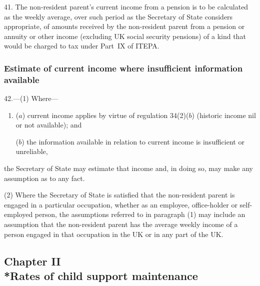 \documentclass[12pt,a4paper]{article}
\begin{document}
41.  The non-resident parent’s current income from a pension is to be calculated as the weekly average, over such period as the Secretary of State considers appropriate, of amounts received by the non-resident parent from a pension or annuity or other income (excluding UK social security pensions) of a kind that would be charged to tax under Part~IX of ITEPA.

\subsubsection[42. Estimate of current income where insufficient information available]{Estimate of current income where insufficient information available}

42.---(1)  Where—
\begin{enumerate}\item[]
($a$) current income applies by virtue of 
regulation 34(2)($b$)  
(historic income 
nil or  %
not available); and

($b$) the information available in relation to current income is insufficient or unreliable,
\end{enumerate}
the Secretary of State may estimate that income and, in doing so, may make any assumption as to any fact.

(2) Where the Secretary of State is satisfied that the non-resident parent is engaged in a particular occupation, whether as an employee, office-holder or self-employed person, the assumptions referred to in paragraph (1) may include an assumption that the non-resident parent has the average weekly income of a person engaged in that occupation in the UK or in any part of the UK.


\subsection[Chapter II --- Rates of child support maintenance]{Chapter II\\*Rates of child support maintenance}
\end{document}
